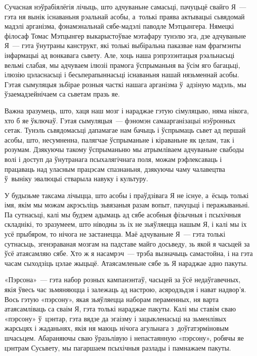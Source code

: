 Сучасная нэўрабіялёгія лічыць, што адчуваньне самасьці, пачуцьцё свайго Я~--- гэта ня вынік існаваньня рэальнай асобы, а~толькі праява актывацыі сьвядомай мадэлі арганізма, фэнамэнальнай сябе-мадэлі паводле Мэтцынгера. Нямецкі філосаф Томас Мэтцынгер выкарыстоўвае мэтафару тунэлю эга, дзе адчуваньне Я~--- гэта ўнутраны канструкт, які толькі выбіральна паказвае нам фрагмэнты інфармацыі ад вонкавага сьвету. Але, хоць наша рэпрэзэнтацыя рэальнасьці вельмі слабая, мы адчуваем ілюзіі прамога ўспрыманьня ва ўсім яго багацьці, ілюзію цэласнасьці і бесьперапыннасьці існаваньня нашай нязьменнай асобы. Гэтая сымуляцыя зьбірае розныя часткі нашага арганізма ў~адзіную мадэль, мы ўзаемадзейнічаем са сьветам празь яе.

Важна зразумець, што, хаця наш мозг і нараджае гэтую сімуляцыю, няма нікога, хто б яе ўключаў. Гэтая сымуляцыя~--- фэномэн самаарганізацыі нэўронных сетак. Тунэль сьвядомасьці дапамагае нам бачыць і ўспрымаць сьвет ад першай асобы, што, несумненна, палягчае ўспрыманьне і кіраваньне як целам, так і розумам. Дзякуючы такому ўспрыманьню мы атрымліваем адчуваньне свабоды волі і доступ да ўнутранага псыхалягічнага поля, можам рэфлексаваць і працаваць над уласным працэсам спазнаньня, дзякуючы чаму чалавецтва ў~выніку эвалюцыі стварыла навуку і культуру.

У будызьме таксама лічыцца, што асобы і праўдзівага Я не існуе, а~ёсьць толькі імя, якім мы можам акрэсьліць зьвязаныя разам вопыт, пачуцьці і перажываньні. Па сутнасьці, калі мы будзем адымаць ад сябе асобныя фізычныя і псыхічныя складнікі, то зразумеем, што ніводны зь іх не зьяўляецца нашым Я, і калі мы іх усё прыбяром, то нічога не застанецца. Маё адчуваньне Я~--- гэта толькі сутнасьць, згенэраваная мозгам на падставе майго досьведу, зь якой я часьцей за ўсё атаясамляю сябе. Хто ж я насамрэч~--- трэба вызначыць самастойна, і на гэта часам сыходзіць цэлае жыцьцё. Атаясамленьне сябе зь Я нараджае адно пакуты.

«Пэрсона»~--- гэта набор розных кампанэнтаў, часьцей за ўсё недаўгавечных, якія ўвесь час зьмяняюцца і залежаць ад настрою, асяродзьдзя і нават надвор'я. Вось гэтую «пэрсону», якая зьяўляецца наборам пераменных, ня варта атаясамліваць са сваім Я, гэта толькі нараджае пакуты. Калі мы ставім сваю «пэрсону» ў~цэнтар, гэта вядзе да эгаізму і зацыкленасьці на зьменлівых жарсьцях і жаданьнях, якія ня маюць нічога агульнага з~доўгатэрміновым шчасьцем. Абараняючы сваю ўразьлівую і непастаянную «пэрсону», робячы яе цэнтрам Сусьвету, мы пагаршаем псыхічныя разлады і памнажаем пакуты.

